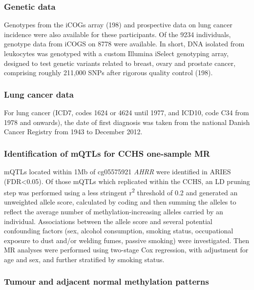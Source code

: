 \documentclass[11pt,oneside]{bristolthesis}
\begin{document}
\hypertarget{genetic-data}{%
\subsubsection{Genetic data}\label{genetic-data}}

Genotypes from the iCOGs array (198) and prospective data on lung cancer incidence were also available for these participants. Of the 9234 individuals, genotype data from iCOGS on 8778 were available. In short, DNA isolated from leukocytes was genotyped with a custom Illumina iSelect genotyping array, designed to test genetic variants related to breast, ovary and prostate cancer, comprising roughly 211,000 SNPs after rigorous quality control (198).

\hypertarget{lung-cancer-data}{%
\subsubsection{Lung cancer data}\label{lung-cancer-data}}

For lung cancer (ICD7, codes 1624 or 4624 until 1977, and ICD10, code C34 from 1978 and onwards), the date of first diagnosis was taken from the national Danish Cancer Registry from 1943 to December 2012.

\hypertarget{identification-of-mqtls-for-cchs-one-sample-mr}{%
\subsubsection{Identification of mQTLs for CCHS one-sample MR}\label{identification-of-mqtls-for-cchs-one-sample-mr}}

mQTLs located within 1Mb of cg05575921 \emph{AHRR} were identified in ARIES (FDR\textless0.05). Of those mQTLs which replicated within the CCHS, an LD pruning step was performed using a less stringent r\textsuperscript{2} threshold of 0.2 and generated an unweighted allele score, calculated by coding and then summing the alleles to reflect the average number of methylation-increasing alleles carried by an individual. Associations between the allele score and several potential confounding factors (sex, alcohol consumption, smoking status, occupational exposure to dust and/or welding fumes, passive smoking) were investigated. Then MR analyses were performed using two-stage Cox regression, with adjustment for age and sex, and further stratified by smoking status.

\hypertarget{lc-heathly-v-normal-methods}{%
\subsubsection{Tumour and adjacent normal methylation patterns}\label{lc-heathly-v-normal-methods}}
\end{document}
